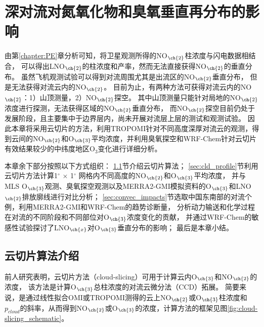 
\chapter{深对流对氮氧化物和臭氧垂直再分布的影响}

由第\ref{chapter:PE}章分析可知，将卫星观测所得的NO$_{\ch{2}}$柱浓度与闪电数据相结合，
可以得出LNO$_{\ch{2}}$的柱浓度和产率，然而无法直接获得NO$_{\ch{2}}$的垂直分布。
虽然飞机观测试验可以得到对流周围尤其是出流区的NO$_{\ch{2}}$垂直分布\citep{Barth.2019}，
但是无法获得对流云内的NO$_{\ch{2}}$。
目前为止，有两种方法可获得对流云内的NO$_{\ch{2}}$：1）山顶测量，2）NO$_{\ch{2}}$探空。
其中山顶测量只能针对局地的NO$_{\ch{2}}$浓度进行探测，无法获得区域的NO$_{\ch{2}}$垂直分布\citep{Reiter.1970,Wang.2021a}，
而NO$_{\ch{2}}$探空目前仍处于发展阶段，且主要集中于边界层内\citep{Sluis.2010}，尚未开展对流层上层的测试和观测试验。
因此本章将采用云切片的方法，利用TROPOMI针对不同高度深厚对流云的观测，得到云间的NO$_{\ch{2}}$和O$_{\ch{3}}$平均浓度，并利用臭氧探空和WRF-Chem针对云切片有效结果较少的中纬度地区O$_3$变化进行详细分析。

本章余下部分按照以下方式组织：
\ref{sec:cloud-slicing}节介绍云切片算法；
\ref{sec:cld_profile}节利用云切片方法计算1$^{\circ}$ $\times$ 1$^{\circ}$ 网格内不同高度的NO$_{\ch{2}}$和O$_{\ch{3}}$平均浓度，
并与MLS O$_{\ch{3}}$观测、臭氧探空观测以及MERRA2-GMI模拟资料的O$_{\ch{3}}$和LNO$_{\ch{2}}$排放廓线进行对比分析；
\ref{sec:convec_impacts}节选取中国东南部的对流个例，利用MERRA2-GMI和WRF-Chem的趋势诊断量，
分析动力输送和化学过程在对流的不同阶段和不同部位对O$_{\ch{3}}$浓度变化的贡献，
并通过WRF-Chem的敏感性试验探讨了LNO$_{\ch{x}}$对O$_{\ch{3}}$垂直分布的影响；
最后是本章小结。


\section{云切片算法介绍} \label{sec:cloud-slicing}

前人研究表明，云切片方法（cloud-slicing）可用于计算云内O$_{\ch{3}}$和NO$_{\ch{2}}$的浓度，
该方法是计算O$_{\ch{3}}$总柱浓度的对流云微分法（CCD）拓展\citep{Ziemke.1998,Ziemke.2001}。
简要来说，是通过线性拟合OMI或TROPOMI测得的云上NO$_{\ch{2}}$或O$_{\ch{3}}$柱浓度和$p_{cloud}$的斜率，从而得到NO$_{\ch{2}}$或O$_{\ch{3}}$的浓度，计算方法的框架见图\ref{fig:cloud-slicing_schematic}。

